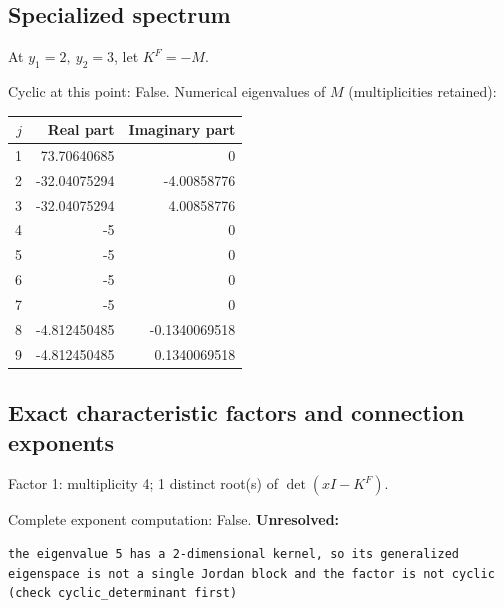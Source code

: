 \documentclass[10pt,a4paper]{article}
\newcommand{\fitmath}[1]{\sbox{\mathbox}{$\displaystyle #1$}\ifdim\wd\mathbox>\linewidth\resizebox{\linewidth}{!}{\usebox{\mathbox}}\else\usebox{\mathbox}\fi}
\begin{document}
\subsection*{Specialized spectrum}
At $y_1=2,\ y_2=3$, let $K^F=-M$.
\begin{center}\fitmath{\Delta=0}\end{center}
Cyclic at this point: False.
Numerical eigenvalues of $M$ (multiplicities retained):
\begin{center}\small\begin{tabular}{rrr}\toprule $j$ & Real part & Imaginary part\\\midrule
1 & 73.70640685 & 0\\
2 & -32.04075294 & -4.00858776\\
3 & -32.04075294 & 4.00858776\\
4 & -5 & 0\\
5 & -5 & 0\\
6 & -5 & 0\\
7 & -5 & 0\\
8 & -4.812450485 & -0.1340069518\\
9 & -4.812450485 & 0.1340069518\\
\bottomrule\end{tabular}\end{center}
\subsection*{Exact characteristic factors and connection exponents}
Factor 1: multiplicity 4; 1 distinct root(s) of $\det(xI-K^F)$.
\begin{center}\fitmath{\begin{aligned}p_{1}(x)&=x - 5\end{aligned}}\end{center}
Complete exponent computation: False.
\textbf{Unresolved:}

\begin{lstlisting}
the eigenvalue 5 has a 2-dimensional kernel, so its generalized eigenspace is not a single Jordan block and the factor is not cyclic (check cyclic_determinant first)
\end{lstlisting}
\end{document}
